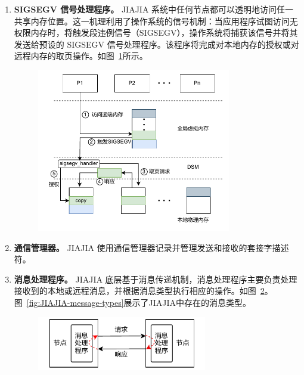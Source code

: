 {\begin{enumerate}[label=\arabic*.]
        \item \textbf{SIGSEGV 信号处理程序。} JIAJIA 系统中任何节点都可以透明地访问任一共享内存位置。这一机理利用了操作系统的信号机制：当应用程序试图访问无权限内存时，将触发段违例信号（SIGSEGV），操作系统将捕获该信号并将其发送给预设的 SIGSEGV 信号处理程序。该程序将完成对本地内存的授权或对远程内存的取页操作。如图~\ref{fig:JIAJIA-access}所示。
              \begin{figure}[!htbp]
                  \centering
                  \includegraphics[width=0.8\textwidth]{Img/JIAJIA访问远端内存.drawio.pdf}
                  \label{fig:JIAJIA-access}
              \end{figure}

        \item \textbf{通信管理器。} JIAJIA 使用通信管理器记录并管理发送和接收的套接字描述符。

        \item \textbf{消息处理程序。} JIAJIA 底层基于消息传递机制，消息处理程序主要负责处理接收到的本地或远程消息，并根据消息类型执行相应的操作。如图~\ref{fig:JIAJIA-message-handle}。图~\ref{fig:JIAJIA-message-types}展示了JIAJIA中存在的消息类型。
              \begin{figure}[!htbp]
                  \centering
                  \includegraphics[width=0.7\textwidth]{Img/JIAJIA底层消息传递机制.drawio.pdf}
                  \label{fig:JIAJIA-message-handle}
              \end{figure}


\end{enumerate}}
